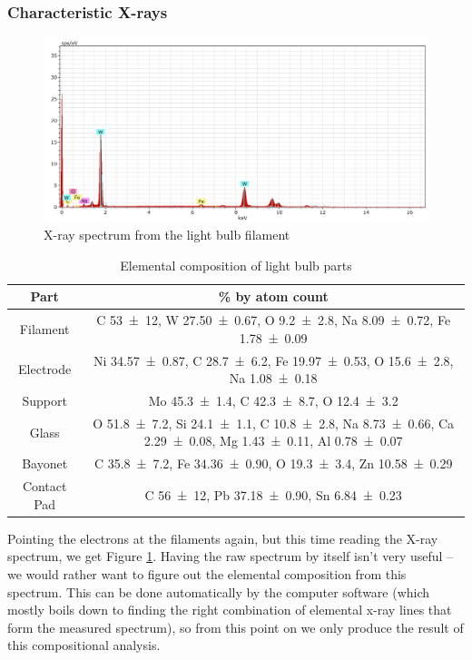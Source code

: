 \documentclass[a4paper]{scrartcl}
\begin{document}
\subsubsection{Characteristic X-rays}
\begin{figure}
    \centering
    \includegraphics[width = 15cm]{measurements/XR-LB-filament.png}
    \caption{X-ray spectrum from the light bulb filament}
    \label{fig:xr-filament}
\end{figure}
\begin{table}
    \centering
    \begin{tabular}{c | c}
    Part & \si{\percent} by atom count \\
    \hline
    Filament & C \SI{53 \pm 12}{}, W \SI{27.50 \pm 0.67}{}, O \SI{9.2 \pm 2.8}{}, Na \SI{8.09 \pm 0.72}{}, Fe \SI{1.78 \pm 0.09}{} \\
    Electrode & Ni \SI{34.57 \pm 0.87}{}, C \SI{28.7 \pm 6.2}{}, Fe \SI{19.97 \pm 0.53}{}, O \SI{15.6 \pm 2.8}{}, Na \SI{1.08 \pm 0.18}{} \\
    Support & Mo \SI{45.3 \pm 1.4}{}, C \SI{42.3 \pm 8.7}{}, O \SI{12.4 \pm 3.2}{} \\
    Glass & O \SI{51.8 \pm 7.2}{}, Si \SI{24.1 \pm 1.1}{}, C \SI{10.8 \pm 2.8}{}, Na \SI{8.73 \pm 0.66}{}, Ca \SI{2.29 \pm 0.08}{}, Mg \SI{1.43 \pm 0.11}{}, Al \SI{0.78 \pm 0.07}{} \\
    Bayonet & C \SI{35.8 \pm 7.2}{}, Fe \SI{34.36 \pm 0.90}{}, O \SI{19.3 \pm 3.4}{}, Zn \SI{10.58 \pm 0.29}{} \\
    Contact Pad & C \SI{56 \pm 12}{}, Pb \SI{37.18 \pm 0.90}{}, Sn \SI{6.84 \pm 0.23}{}
    \end{tabular}
    \caption{Elemental composition of light bulb parts}
    \label{tab:xr-light-bulb}
\end{table}

Pointing the electrons at the filaments again, but this time reading the X-ray spectrum, we get Figure \ref{fig:xr-filament}. Having the raw spectrum by itself isn't very useful -- we would rather want to figure out the elemental composition from this spectrum. This can be done automatically by the computer software (which mostly boils down to finding the right combination of elemental x-ray lines that form the measured spectrum), so from this point on we only produce the result of this compositional analysis.
\end{document}
